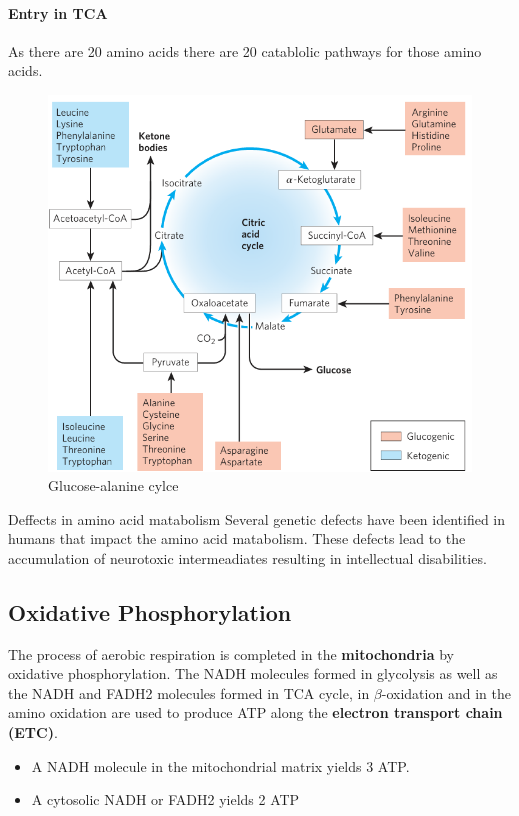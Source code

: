 \documentclass[../main.tex]{subfiles}
\begin{document}
\paragraph{Entry in TCA}
As there are 20 amino acids there are 20 catablolic pathways for those amino acids. 
\begin{figure}[H]
	\centering
	\includegraphics[width = 0.7 \textwidth]{AA2_4}
	\caption{Glucose-alanine cylce}
\end{figure}  

\begin{RemarkWithTitel}{Deffects in amino acid matabolism}
	Several genetic defects have been identified in humans that impact the amino acid matabolism. These defects lead to the accumulation of neurotoxic intermeadiates resulting in intellectual disabilities. 
\end{RemarkWithTitel}


\subsection{Oxidative Phosphorylation}
The process of aerobic respiration is completed in the \textbf{mitochondria} by oxidative phosphorylation. The NADH molecules formed in glycolysis as well as the NADH and FADH2 molecules formed in TCA cycle, in $\beta$-oxidation and in the amino oxidation are used to produce ATP along the \textbf{electron transport chain (ETC)}.

\begin{itemize}
	\item A NADH molecule in the mitochondrial matrix yields 3 ATP. 
	\item A cytosolic NADH or FADH2 yields 2 ATP
\end{itemize}
\end{document}
